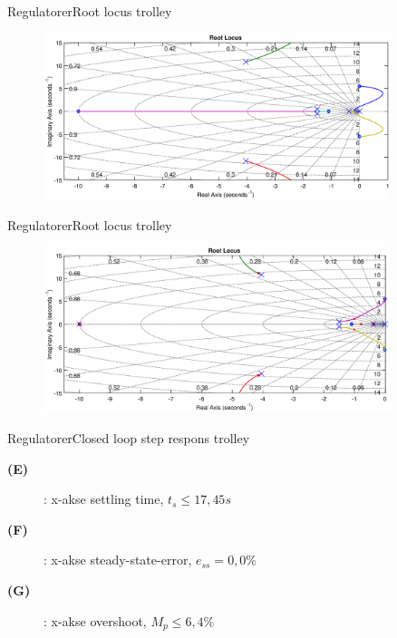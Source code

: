 \begin{frame}{Regulatorer}{Root locus trolley}
\vspace{1cm}
\begin{figure}[H]
\centering
\includegraphics[width=0.9\textwidth]{Billeder/Thomas/Simon}
\end{figure}
\end{frame}

\begin{frame}{Regulatorer}{Root locus trolley}
\vspace{1cm}
\begin{figure}[H]
\centering
\includegraphics[width=0.9\textwidth]{Billeder/Thomas/Trolleyopenloop}
\end{figure}
\end{frame}

\begin{frame}{Regulatorer}{Closed loop step respons trolley}

\begin{figure}[H]
\centering

\end{figure}


\vspace{0.2cm}
\begin{description}
    \item[\textbf{(E)}] : x-akse settling time, $t_s \leq 17,45 s$
    \item[\textbf{(F)}] : x-akse steady-state-error, $e_{ss} = 0,0\%$ 
    \item[\textbf{(G)}] : x-akse overshoot, $M_p \leq 6,4\%$
\end{description}
\vspace{0.6cm}

\end{frame}

